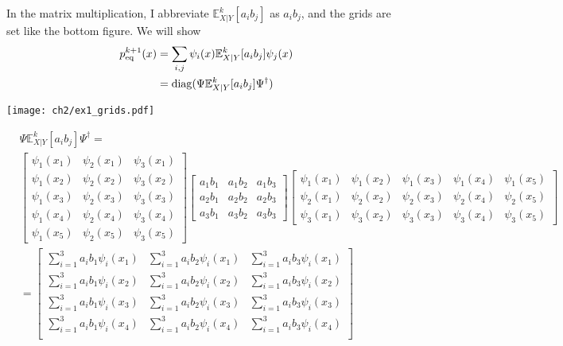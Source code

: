 \begin{example}[$N_v=3$] In the matrix multiplication, I abbreviate $\mathbb{E}^k_{X|Y}[a_ib_j]$ as $a_ib_j$, and the grids are set like the bottom figure. We will show
\begin{align*}
    p_{\rm eq}^{k+1}(x) &=\sum_{i,j} \psi_i(x) \mathbb{E}^k_{X|Y}[a_ib_j] \psi_j(x) \\
    &= \mathrm{diag}(\Psi \mathbb{E}^k_{X|Y}[a_ib_j] \Psi^{\dagger})
\end{align*}
\begin{center}
    \texttt{[image: ch2/ex1\_grids.pdf]}   
\end{center}
\begin{align*} 
&\Psi \mathbb{E}^k_{X|Y}[a_ib_j] \Psi^{\dagger} = \\
&\begin{bmatrix}
    \psi_1(x_1) & \psi_2(x_1) & \psi_3(x_1)  \\
    \psi_1(x_2) & \psi_2(x_2) & \psi_3(x_2) \\
    \psi_1(x_3) & \psi_2(x_3) & \psi_3(x_3)  \\
    \psi_1(x_4) & \psi_2(x_4) & \psi_3(x_4)  \\
    \psi_1(x_5) & \psi_2(x_5) & \psi_3(x_5)  
\end{bmatrix}
\begin{bmatrix}
    a_1 b_1 & a_1 b_2 & a_1 b_3  \\
    a_2 b_1 & a_2 b_2 & a_2 b_3 \\
    a_3 b_1 & a_3 b_2 & a_3 b_3
\end{bmatrix}
\begin{bmatrix}
    \psi_1(x_1) & \psi_1(x_2) & \psi_1(x_3) & \psi_1(x_4) & \psi_1(x_5) \\
    \psi_2(x_1) & \psi_2(x_2) & \psi_2(x_3) & \psi_2(x_4) & \psi_2(x_5) \\
    \psi_3(x_1) & \psi_3(x_2) & \psi_3(x_3) & \psi_3(x_4) & \psi_3(x_5) 
\end{bmatrix} \\
&=\begin{bmatrix}
    \sum_{i=1}^{3}a_i b_1 \psi_i(x_1) & \sum_{i=1}^{3}a_i b_2 \psi_i(x_1) & \sum_{i=1}^{3}a_i b_3 \psi_i(x_1) \\
    \sum_{i=1}^{3}a_i b_1 \psi_i(x_2) & \sum_{i=1}^{3}a_i b_2 \psi_i(x_2) & \sum_{i=1}^{3}a_i b_3 \psi_i(x_2) \\
    \sum_{i=1}^{3}a_i b_1 \psi_i(x_3) & \sum_{i=1}^{3}a_i b_2 \psi_i(x_3) & \sum_{i=1}^{3}a_i b_3 \psi_i(x_3) \\
    \sum_{i=1}^{3}a_i b_1 \psi_i(x_4) & \sum_{i=1}^{3}a_i b_2 \psi_i(x_4) & \sum_{i=1}^{3}a_i b_3 \psi_i(x_4) \\

\end{bmatrix}
\end{align*}
\end{example}
